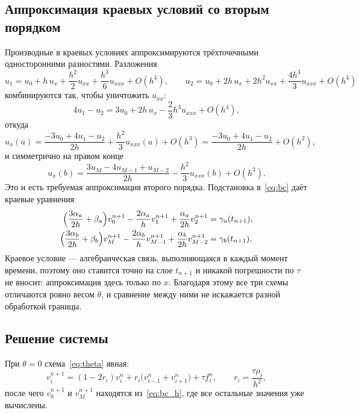 \documentclass[12pt,a4paper]{article}
\begin{document}
\subsection{Аппроксимация краевых условий со вторым порядком}
\label{sec:bc}

Производные в краевых условиях аппроксимируются трёхточечными
односторонними разностями. Разложения
\[
u_1=u_0+h\,u_x+\frac{h^2}{2}u_{xx}+\frac{h^3}{6}u_{xxx}+O(h^4),
\qquad
u_2=u_0+2h\,u_x+2h^2u_{xx}+\frac{4h^3}{3}u_{xxx}+O(h^4)
\]
комбинируются так, чтобы уничтожить $u_{xx}$:
\[
4u_1-u_2=3u_0+2h\,u_x-\frac{2}{3}h^3u_{xxx}+O(h^4),
\]
откуда
\begin{equation}\label{eq:onesided}
u_x(a)=\frac{-3u_0+4u_1-u_2}{2h}+\frac{h^2}{3}u_{xxx}(a)+O(h^3)
     =\frac{-3u_0+4u_1-u_2}{2h}+O(h^2),
\end{equation}
и симметрично на правом конце
\begin{equation}\label{eq:onesided_b}
u_x(b)=\frac{3u_M-4u_{M-1}+u_{M-2}}{2h}-\frac{h^2}{3}u_{xxx}(b)+O(h^3).
\end{equation}
Это и есть требуемая аппроксимация второго порядка. Подстановка
в~\eqref{eq:bc} даёт краевые уравнения
\begin{equation}\label{eq:bc_h}
\begin{aligned}
\Bigl(\frac{3\alpha_a}{2h}+\beta_a\Bigr)v_0^{n+1}
 -\frac{2\alpha_a}{h}v_1^{n+1}+\frac{\alpha_a}{2h}v_2^{n+1}
 &=\gamma_a(t_{n+1}),\\
\Bigl(\frac{3\alpha_b}{2h}+\beta_b\Bigr)v_M^{n+1}
 -\frac{2\alpha_b}{h}v_{M-1}^{n+1}+\frac{\alpha_b}{2h}v_{M-2}^{n+1}
 &=\gamma_b(t_{n+1}).
\end{aligned}
\end{equation}
Краевое условие --- алгебраическая связь, выполняющаяся в каждый момент
времени, поэтому оно ставится точно на слое $t_{n+1}$ и никакой
погрешности по $\tau$ не вносит: аппроксимация здесь только по $x$.
Благодаря этому все три схемы отличаются ровно весом $\theta$, и
сравнение между ними не искажается разной обработкой границы.

\subsection{Решение системы}

При $\theta=0$ схема~\eqref{eq:theta} явная:
\begin{equation}\label{eq:explicit}
v_i^{n+1}=(1-2r_i)v_i^n+r_i\bigl(v_{i-1}^n+v_{i+1}^n\bigr)+\tau f_i^n,
\qquad r_i=\frac{\tau\rho_i}{h^2},
\end{equation}
после чего $v_0^{n+1}$ и $v_M^{n+1}$ находятся из~\eqref{eq:bc_h}, где
все остальные значения уже вычислены.
\end{document}
